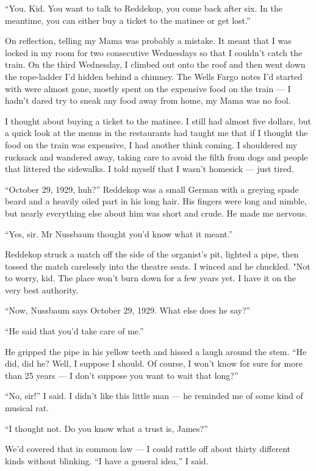 ``You. Kid. You want to talk to Reddekop, you come back after six. In the 
meantime, you can either buy a ticket to the matinee or get lost.''

On reflection, telling my Mama was probably a mistake. It meant
that I was locked in my room for two consecutive Wednesdays so that
I couldn't catch the train. On the third Wednesday, I climbed out
onto the roof and then went down the rope-ladder I'd hidden behind
a chimney. The Wells Fargo notes I'd started with were almost gone,
mostly spent on the expensive food on the train --- I hadn't dared
try to sneak any food away from home, my Mama was no fool.

I thought about buying a ticket to the matinee. I still had almost
five dollars, but a quick look at the menus in the restaurants had
taught me that if I thought the food on the train was expensive, I
had another think coming. I shouldered my rucksack and wandered
away, taking care to avoid the filth from dogs and people that
littered the sidewalks. I told myself that I wasn't homesick ---
just tired.

\tb

``October 29, 1929, huh?'' Reddekop was a small German with a
greying spade beard and a heavily oiled part in his long hair. His
fingers were long and nimble, but nearly everything else about him
was short and crude. He made me nervous.

``Yes, sir. Mr Nussbaum thought you'd know what it meant.''

Reddekop struck a match off the side of the organist's pit, lighted
a pipe, then tossed the match carelessly into the theatre seats. I
winced and he chuckled. "Not to worry, kid. The place won't burn
down for a few years yet. I have it on the very best authority.

``Now, Nussbaum says October 29, 1929. What else does he say?''

``He said that you'd take care of me.''

He gripped the pipe in his yellow teeth and hissed a laugh around
the stem.
``He did, did he? Well, I suppose I should. Of course, I won't know for sure 
for more than 25 years --- I don't suppose you want to wait that long?''

``No, sir!'' I said. I didn't like this little man --- he reminded
me of some kind of musical rat.

``I thought not. Do you know what a trust is, James?''

We'd covered that in common law --- I could rattle off about thirty
different kinds without blinking. ``I have a general idea,'' I
said.

